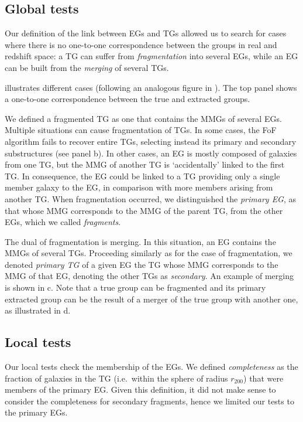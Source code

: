 \subsection{Global tests}

Our definition of the link between EGs and TGs allowed us to search for cases
where there is no one-to-one correspondence between the groups in real and
redshift space: a TG can suffer from  \emph{fragmentation} into several EGs,
while an EG can be built from the \emph{merging} of several TGs.

 illustrates different cases (following an analogous
figure in \citealp{Knobel+09}). The top panel shows a one-to-one correspondence
between the true and extracted groups.

We defined a fragmented TG as one that contains the MMGs of several EGs.
Multiple situations can cause fragmentation of TGs. In some cases, the FoF
algorithm fails to recover entire TGs, selecting instead its primary and
secondary substructures (see panel b). In other cases, an
EG is mostly composed of galaxies from one TG, but the MMG of another TG is
`accidentally' linked  to the first TG\@. In consequence, the EG could be
linked to a TG providing only a single member galaxy to the EG, in comparison
with more members arising from another TG\@. When fragmentation occurred, we
distinguished the \emph{primary EG}, as that whose MMG corresponds to the MMG
of the parent TG, from the other EGs, which we called \emph{fragments}.

The dual of fragmentation is merging. In this situation, an EG contains the
MMGs of several TGs. Proceeding similarly as for the case of fragmentation, we
denoted \emph{primary TG} of a given EG the TG whose MMG corresponds to the MMG
of that EG, denoting the other TGs as \emph{secondary}. An example of merging
is shown in c. Note that a true group can be fragmented
and its primary extracted group can be the result of a merger of the true group
with another one, as illustrated in d.

\subsection{Local tests}
\label{sec:localtests}

Our local tests check the membership of the EGs. We defined \emph{completeness}
as the fraction of galaxies in the TG (i.e.\ within the sphere of radius
$r_{200}$) that were members of the primary EG\@. Given this definition, it did
not make sense to consider the completeness for secondary fragments, hence we
limited our tests to the primary EGs.

